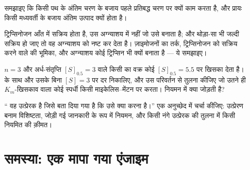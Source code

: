 \begin{exercise}[$\star\star$]\label{exo:b1:enzymes:9}
समझाइए कि  किसी पथ के अंतिम चरण के बजाय पहले प्रतिबद्ध
चरण पर क्यों काम करता है, और  प्रायः किसी मध्यवर्ती के बजाय अंतिम
उत्पाद क्यों होता है।
\end{exercise}

\begin{exercise}[$\star\star\star$]\label{exo:b1:enzymes:10}
ट्रिप्सिनोजन आँत में सक्रिय होता है, उस अग्न्याशय में नहीं जो उसे बनाता
है; और थोड़ा-सा भी जल्दी सक्रिय हो जाए तो वह अग्न्याशय को नष्ट कर देता
है। ज़ाइमोजनों का तर्क, ट्रिप्सिनोजन को सक्रिय करने वाले  की भूमिका,
और अग्न्याशय कोई ट्रिप्सिन  भी क्यों बनाता है --- ये समझाइए।
\end{exercise}

\begin{exercise}[$\star\star\star$]\label{exo:b1:enzymes:11}
$n = 3$ और अर्ध-संतृप्ति $[S]_{0.5}
= 3$ वाले किसी  का वक्र कोई 
$[S]_{0.5} = 5.5$ पर खिसका देता है।
 के साथ और उसके बिना $[S] = 3$ पर दर निकालिए, और उस परिवर्तन से
तुलना कीजिए जो उतने ही $K_m$-खिसकाव वाला कोई स्पर्धी  किसी
माइकेलिस--मेंटन  पर करता।  नियमन में क्या जोड़ती है?
\end{exercise}

\begin{exercise}[$\star\star\star$]\label{exo:b1:enzymes:12}
`` वह उत्प्रेरक है जिसे बता दिया गया है कि उसे क्या करना है।'' एक
अनुच्छेद में चर्चा कीजिए: उत्प्रेरण बनाम विशिष्टता, जोड़ी गई जानकारी के
रूप में नियमन, और किसी नंगे उत्प्रेरक की तुलना में किसी नियमित  की
क़ीमत।
\end{exercise}

\section{समस्या: एक मापा गया एंजाइम}


